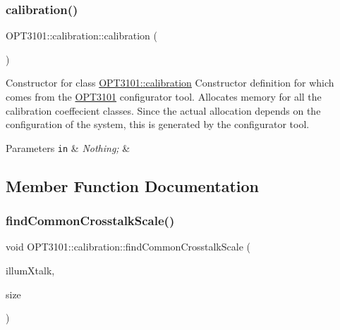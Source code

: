 \subsubsection{\texorpdfstring{calibration()}{calibration()}\hspace{0.1cm}{\footnotesize\ttfamily [2/2]}}
{\footnotesize\ttfamily O\+P\+T3101\+::calibration\+::calibration (\begin{DoxyParamCaption}\item[{void}]{ }\end{DoxyParamCaption})}



Constructor for class \mbox{\hyperlink{class_o_p_t3101_1_1calibration}{O\+P\+T3101\+::calibration}} Constructor definition for which comes from the \mbox{\hyperlink{namespace_o_p_t3101}{O\+P\+T3101}} configurator tool. Allocates memory for all the calibration coeffecient classes. Since the actual allocation depends on the configuration of the system, this is generated by the configurator tool. 


\begin{DoxyParams}[1]{Parameters}
\mbox{\tt in}  & {\em Nothing;} & \\
\hline
\end{DoxyParams}


\subsection{Member Function Documentation}
\mbox{\label{class_o_p_t3101_1_1calibration_a68e5beea82c3c36560049a6da50e0838}} 
\subsubsection{\texorpdfstring{find\+Common\+Crosstalk\+Scale()}{findCommonCrosstalkScale()}}
{\footnotesize\ttfamily void O\+P\+T3101\+::calibration\+::find\+Common\+Crosstalk\+Scale (\begin{DoxyParamCaption}\item[{\mbox{\hyperlink{class_o_p_t3101_1_1crosstalk_c}{O\+P\+T3101\+::crosstalkC}} $\ast$}]{illum\+Xtalk,  }\item[{uint8\+\_\+t}]{size }\end{DoxyParamCaption})}



